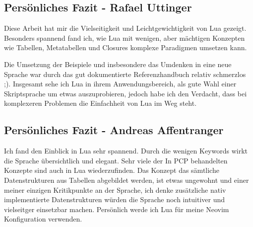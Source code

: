 \documentclass[11pt,a4paper]{article}
\begin{document}
\subsection*{Persönliches Fazit - Rafael Uttinger}
Diese Arbeit hat mir die Vielseitigkeit und Leichtgewichtigkeit von Lua gezeigt.
Besonders spannend fand ich, wie Lua mit wenigen, aber mächtigen Konzepten wie Tabellen, Metatabellen und Closures komplexe Paradigmen umsetzen kann.

Die Umsetzung der Beispiele und insbesondere das Umdenken in eine neue Sprache war durch das gut dokumentierte Referenzhandbuch relativ schmerzlos ;).
Insgesamt sehe ich Lua in ihrem Anwendungsbereich, als gute Wahl einer Skriptsprache um etwas auszuprobieren, jedoch habe ich den Verdacht,
dass bei komplexeren Problemen die Einfachheit von Lua im Weg steht.

\subsection*{Persönliches Fazit - Andreas Affentranger}
Ich fand den Einblick in Lua sehr spannend. Durch die wenigen Keywords wirkt die Sprache übersichtlich und elegant. Sehr viele der In PCP behandelten Konzepte sind auch in Lua
wiederzufinden. Das Konzept das sämtliche Datenstrukturen aus Tabellen abgebildet werden, ist etwas ungewohnt und einer meiner einzigen Kritikpunkte an der Sprache, ich denke zusätzliche nativ implementierte Datenstrukturen
würden die Sprache noch intuitiver und vielseitger einsetzbar machen. Persönlich werde ich Lua für meine Neovim Konfiguration verwenden.
\end{document}
